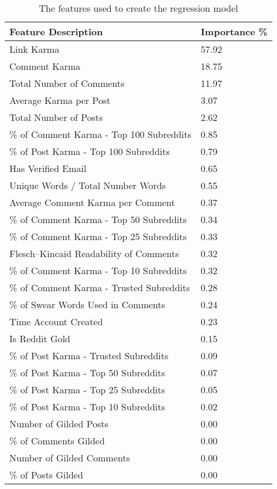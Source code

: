 \begin{table}[tb]
    \caption{The features used to create the regression model}
    \label{tab:features}
    \centering
    \scriptsize

    \begin{tabular}{l|l}
    \hline

    \hline
    \textbf{Feature Description} & \textbf{Importance \%} \\
    \hline
Link Karma & 57.92\\
Comment Karma & 18.75\\
Total Number of Comments & 11.97\\
Average Karma per Post & 3.07\\
Total Number of Posts & 2.62\\
\% of Comment Karma - Top 100 Subreddits & 0.85\\
\% of Post Karma - Top 100 Subreddits & 0.79\\
Has Verified Email & 0.65\\
Unique Words / Total Number Words & 0.55\\
Average Comment Karma per Comment & 0.37\\
\% of Comment Karma - Top 50 Subreddits & 0.34\\
\% of Comment Karma - Top 25 Subreddits & 0.33\\
Flesch--Kincaid Readability of Comments & 0.32\\
\% of Comment Karma - Top 10 Subreddits & 0.32\\
\% of Comment Karma - Trusted Subreddits & 0.28\\
\% of Swear Words Used in Comments & 0.24\\
Time Account Created & 0.23\\
Is Reddit Gold & 0.15\\
\% of Post Karma - Trusted Subreddits & 0.09\\
\% of Post Karma - Top 50 Subreddits & 0.07\\
\% of Post Karma - Top 25 Subreddits & 0.05\\
\% of Post Karma - Top 10 Subreddits & 0.02\\
Number of Gilded Posts & 0.00\\
\% of Comments Gilded & 0.00\\
Number of Gilded Comments & 0.00\\
\% of Posts Gilded & 0.00\\
    \hline

    \hline
    \end{tabular}
\end{table}

